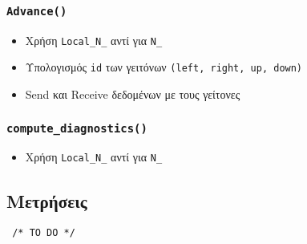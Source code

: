 \documentclass[11pt]{scrartcl} %
\begin{document}
        \subsubsection*{\texttt{Advance()}}
            \begin{itemize}
                \item Χρήση \texttt{Local\_N\_} αντί για \texttt{N\_}
                \item Υπολογισμός \texttt{id} των γειτόνων \texttt{(left, right, up, down)}
                \item Send και Receive δεδομένων με τους γείτονες
            \end{itemize}
        \subsubsection*{\texttt{compute\_diagnostics()}}
        \begin{itemize}
            \item Χρήση \texttt{Local\_N\_} αντί για \texttt{N\_}
        \end{itemize}
    
    \subsection*{Μετρήσεις}
        \texttt{ /* TO DO */}
            
        
\end{document}
